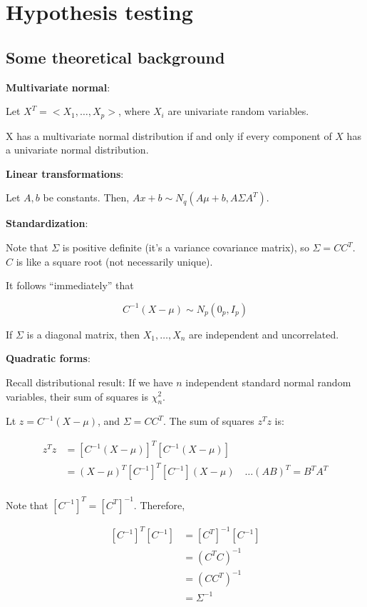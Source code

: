 \section{Hypothesis testing}

\subsection{Some theoretical background}

\textbf{Multivariate normal}:

Let $X^T = < X_1,\dots,X_p>$, where $X_i$ are univariate random variables.

X has a multivariate normal distribution if and only if every component of $X$ has a univariate normal distribution.


\textbf{Linear transformations}:

Let $A, b$ be constants. Then, $Ax + b\sim N_q (A\mu + b, A\Sigma A^T)$.

\textbf{Standardization}:

Note that $\Sigma$ is positive definite (it's a variance covariance matrix), so $\Sigma = CC^T$. 
$C$ is like a square root (not necessarily unique).
 
It follows ``immediately'' that 

\begin{equation}
C^{-1} (X-\mu) \sim N_p (0_p, I_p)
\end{equation}

If $\Sigma$ is a diagonal matrix, then $X_1,\dots,X_n$ are independent and uncorrelated.

\textbf{Quadratic forms}:

Recall distributional result: If we have $n$ independent standard normal random variables, their sum of squares is $\chi_n^2$.

Lt $z = C^{-1} (X-\mu)$, and $\Sigma=CC^T$. The sum of squares $z^T z$ is:

\begin{equation}
\begin{split}
z^T z & = [C^{-1} (X-\mu)]^T [C^{-1} (X-\mu)]\\
& = (X-\mu)^T [C^{-1}]^T [C^{-1}](X-\mu) \quad \dots (AB)^T=B^T A^T\\
\end{split}
\end{equation} 

Note that $ [C^{-1}]^T =  [C^{T}]^{-1}$. Therefore, 

\begin{equation}
\begin{split}
[C^{-1}]^T [C^{-1}] & = [C^T]^{-1} [C^{-1}]\\
& = (C^T C)^{-1}\\
& = (C C^T)^{-1}\\
& = \Sigma^{-1}\\
\end{split}
\end{equation} 

